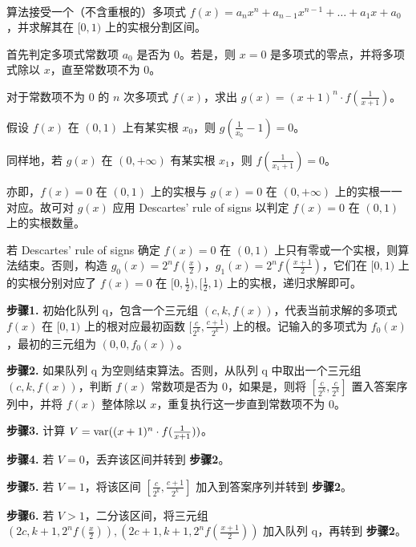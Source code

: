 \begin{algorithm}~

    \label{bisection-isolation}

    算法接受一个（不含重根的）多项式 $f(x)=a_nx^n+a_{n-1}x^{n-1}+\dots+a_1x+a_0$，并求解其在 $[0, 1)$ 上的实根分割区间。
    
    首先判定多项式常数项 $a_0$ 是否为 $0$。若是，则 $x=0$ 是多项式的零点，并将多项式除以 $x$，直至常数项不为 $0$。

    对于常数项不为 $0$ 的 $n$ 次多项式 $f(x)$，求出 $g(x) = (x+1)^n \cdot f(\frac{1}{x+1})$。

    假设 $f(x)$ 在 $(0, 1)$ 上有某实根 $x_0$，则 $g(\frac{1}{x_0}-1) = 0$。

    同样地，若 $g(x)$ 在 $(0, +\infty)$ 有某实根 $x_1$，则 $f(\frac{1}{x_1+1})=0$。

    亦即，$f(x) = 0$ 在 $(0, 1)$ 上的实根与 $g(x) = 0$ 在 $(0, +\infty)$ 上的实根一一对应。故可对 $g(x)$ 应用 Descartes' rule of signs 以判定 $f(x) = 0$ 在 $(0, 1)$ 上的实根数量。

    若 Descartes' rule of signs 确定 $f(x) = 0$ 在 $(0, 1)$ 上只有零或一个实根，则算法结束。否则，构造 $g_0(x) = 2^n f(\frac{x}{2})$，$g_1(x) = 2^n f(\frac{x+1}{2})$，它们在 $[0, 1)$ 上的实根分别对应了 $f(x) = 0$ 在 $[0, \frac{1}{2}), [\frac{1}{2}, 1)$ 上的实根，递归求解即可。

    \textbf{步骤1.} 初始化队列 q，包含一个三元组 $(c, k, f(x))$，代表当前求解的多项式 $f(x)$ 在 $[0, 1)$ 上的根对应最初函数 $[\frac{c}{2^k}, \frac{c+1}{2^k})$ 上的根。记输入的多项式为 $f_0(x)$，最初的三元组为 $(0, 0, f_0(x))$。

    \textbf{步骤2.} 如果队列 q 为空则结束算法。否则，从队列 q 中取出一个三元组 $(c, k, f(x))$，判断 $f(x)$ 常数项是否为 $0$，如果是，则将 $[\frac{c}{2^k}, \frac{c}{2^k}]$ 置入答案序列中，并将 $f(x)$ 整体除以 $x$，重复执行这一步直到常数项不为 $0$。

    \textbf{步骤3.} 计算 $V = \mathrm{var}((x+1)^n \cdot f(\frac{1}{x+1}))$。

    \textbf{步骤4.} 若 $V = 0$，丢弃该区间并转到 \textbf{步骤2}。

    \textbf{步骤5.} 若 $V = 1$，将该区间 $[\frac{c}{2^k}, \frac{c+1}{2^k}]$ 加入到答案序列并转到 \textbf{步骤2}。

	\textbf{步骤6.} 若 $V > 1$，二分该区间，将三元组 $(2c, k + 1, 2^n f(\frac{x}{2})), (2c + 1, k + 1, 2^n f(\frac{x+1}{2}))$ 加入队列 q，再转到 \textbf{步骤2}。
	

\end{algorithm}

